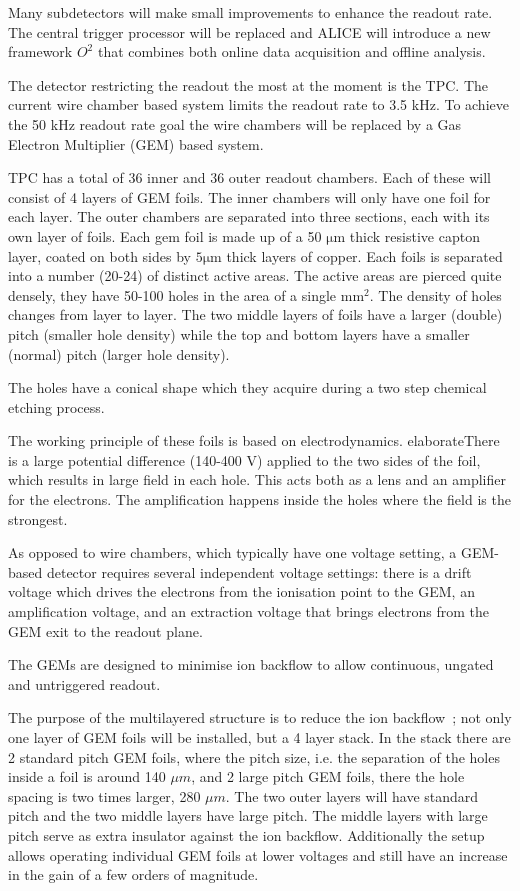 Many subdetectors will make small improvements to enhance the readout rate. The central trigger processor will be replaced and ALICE will introduce a new framework $O^2$ that combines both online data acquisition and offline analysis.

The detector restricting the readout the most at the moment is the TPC. The current wire chamber based system  limits the readout rate to 3.5 kHz. To achieve the 50 kHz readout rate goal the wire chambers will be replaced by a Gas Electron Multiplier (GEM) based system.

TPC has a total of 36 inner and 36 outer readout chambers. Each of these will consist of 4 layers of GEM foils. The inner chambers will only have one foil for each layer. The outer chambers are separated into three sections, each with its own layer of foils. Each gem foil is made up of a 50 $\mathrm{\mu m}$ thick resistive capton layer, coated on both sides by $5 \mathrm{\mu m}$ thick layers of copper. Each foils is separated into a number (20-24) of distinct active areas. The active areas are pierced quite densely, they have 50-100 holes in the area of a single $\mathrm{mm^2}$. The density of holes changes from layer to layer. The two middle layers of foils have a larger (double) pitch (smaller hole density) while the top and bottom layers have a smaller (normal) pitch (larger hole density).

The holes have a conical shape which they acquire during a two step chemical etching process. 

The working principle of these foils is based on electrodynamics. {\color{red} elaborate}There is a large potential difference (140-400 V) applied to the two sides of the foil, which results in large field in each hole. This acts both as a lens and an amplifier for the electrons. The amplification happens inside the holes where the field is the strongest. 

As opposed to wire chambers, which typically have one voltage setting, a GEM-based detector requires several independent voltage settings: there is a drift voltage which drives the electrons from the ionisation point to the GEM, an amplification voltage, and an extraction voltage that brings electrons from the GEM exit to the readout plane. 

The GEMs are designed to minimise ion backflow to allow continuous, ungated and untriggered readout.

The purpose of the multilayered structure is to reduce the ion backflow~\cite{}; not only one layer of GEM foils will be installed, but a 4 layer stack. In the stack there are 2 standard pitch GEM foils, where the pitch size, i.e. the separation of the holes inside a foil is around 140 $\mu m$, and 2 large pitch GEM foils, there the hole spacing is two times larger, 280 $\mu m$. The two outer layers will have standard pitch and the two middle layers have large pitch. The middle layers with large pitch serve as extra insulator against the ion backflow. Additionally the setup allows operating individual GEM foils at lower voltages and still have an increase in the gain of a few orders of magnitude.

